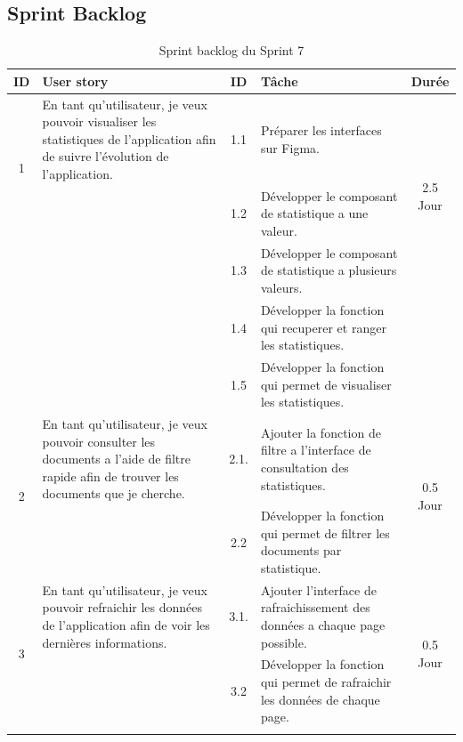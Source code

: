 \subsection{Sprint Backlog}


\begin{adjustwidth}{-1cm}{}
    
    \begin{longtable}{|c|p{6cm}|c|p{6cm}|c|}
      \hline
      \textbf{ID} & \textbf{User story} & \textbf{ID}  & \textbf{Tâche} & \textbf{Durée} \\
      \hline
      \multirow{2}{*}{1} & En tant qu'utilisateur, je veux pouvoir visualiser les statistiques de l'application afin de suivre l'évolution de l'application.
      & 1.1 & Préparer les interfaces sur Figma. & \multirow{3}{*}{2.5 Jour} \\
      \cline{3-4}
      & & 1.2 & Développer le composant de statistique a une valeur. & \\
      \cline{3-4}
      & & 1.3 & Développer le composant de statistique a plusieurs valeurs. & \\
      \cline{3-4}
      & & 1.4 & Développer la fonction qui recuperer et ranger les statistiques. & \\
      & & 1.5 & Développer la fonction qui permet de visualiser les statistiques. & \\
      \cline{1-5}
      \multirow{2}{*}{2} & En tant qu'utilisateur, je veux pouvoir consulter les documents a l'aide de filtre rapide afin de trouver les documents que je cherche. & 2.1.& Ajouter la fonction de filtre a l'interface de consultation des statistiques. & \multirow{2}{*}{0.5 Jour} \\
      \cline{3-4}
      & & 2.2 & Développer la fonction qui permet de filtrer les documents par statistique. & \\
      \cline{1-5}
      \multirow{2}{*}{3} & En tant qu'utilisateur, je veux pouvoir refraichir les données de l'application afin de voir les dernières informations. & 3.1.& Ajouter l'interface de rafraichissement des données a chaque page possible. & \multirow{2}{*}{0.5 Jour} \\
      \cline{3-4}
      & & 3.2 & Développer la fonction qui permet de rafraichir les données de chaque page. & \\
      \cline{1-5}
  \hline
  \caption{Sprint backlog du Sprint 7}
  \label{tab:sprint-backlog-7}
\end{longtable}
\end{adjustwidth}


